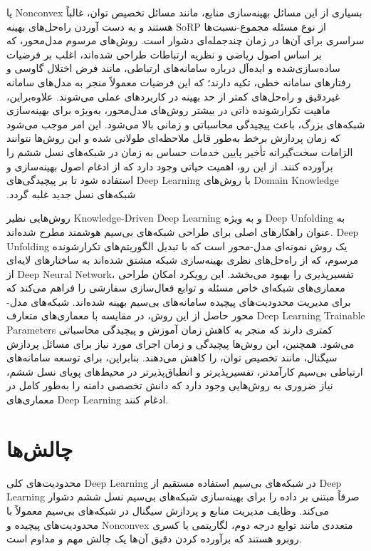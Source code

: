 ‫بسیاری از این مسائل بهینه‌سازی منابع، مانند مسائل تخصیص توان، غالباً
\gls{Nonconvex}
 یا از نوع مسئله مجموع-نسبت‌ها 
\gls{SoRP}
  هستند و به دست آوردن راه‌حل‌های بهینه سراسری برای آن‌ها در زمان چندجمله‌ای دشوار است. روش‌های مرسوم مدل‌محور، که بر اساس اصول ریاضی و نظریه ارتباطات طراحی شده‌اند، اغلب بر فرضیات ساده‌سازی‌شده و ایده‌آل درباره سامانه‌های ارتباطی، مانند فرض اختلال گاوسی و رفتارهای سامانه خطی، تکیه دارند؛ که این فرضیات معمولاً منجر به مدل‌های سامانه غیردقیق و راه‌حل‌های کمتر از حد بهینه در کاربردهای عملی می‌شوند. علاوه‌براین، ماهیت تکرارشونده ذاتی در بیشتر روش‌های مدل‌محور، به‌ویژه برای بهینه‌سازی شبکه‌های بزرگ، باعث پیچیدگی محاسباتی و زمانی بالا می‌شود. این امر موجب می‌شود که زمان پردازش برخط به‌طور قابل ملاحظه‌ای طولانی شده و این روش‌ها نتوانند الزامات سخت‌گیرانه تأخیر پایین خدمات حساس به زمان در شبکه‌های نسل ششم را برآورده کنند.‬
‫از این رو، اهمیت حیاتی وجود دارد که از ادغام اصول بهینه‌سازی و
\gls{Domain Knowledge}
 با روش‌های 
\gls{Deep Learning}
 استفاده شود تا بر پیچیدگی‌های شبکه‌های نسل جدید غلبه گردد.
 
  روش‌هایی نظیر 
\gls{Knowledge-Driven Deep Learning}
  و به ویژه 
\gls{Deep Unfolding}
   به عنوان راهکارهای اصلی برای طراحی شبکه‌های بی‌سیم هوشمند مطرح شده‌اند. 
\gls{Deep Unfolding}
   یک روش نمونه‌ای مدل-محور است که با تبدیل الگوریتم‌های تکرارشونده مرسوم، که از راه‌حل‌های نظری بهینه‌سازی شبکه مشتق شده‌اند به ساختارهای لایه‌ای از 
\gls{Deep Neural Network}،
 تفسیرپذیری را بهبود می‌بخشد. این رویکرد امکان طراحی معماری‌های شبکه‌ای خاص مسئله و توابع فعال‌سازی سفارشی را فراهم می‌کند که برای مدیریت محدودیت‌های پیچیده سامانه‌های بی‌سیم بهینه شده‌اند. شبکه‌های مدل-محور حاصل از این روش، در مقایسه با معماری‌های متعارف 
\gls{Deep Learning}   
\glspl{Trainable Parameter}
    کمتری دارند که منجر به کاهش زمان آموزش و پیچیدگی محاسباتی می‌شود. همچنین، این روش‌ها پیچیدگی و زمان اجرای مورد نیاز برای مسائل پردازش سیگنال، مانند تخصیص توان، را کاهش می‌دهند. بنابراین، برای توسعه سامانه‌های ارتباطی بی‌سیم کارآمدتر، تفسیرپذیرتر و انطباق‌پذیرتر در محیط‌های پویای نسل ششم، نیاز ضروری به روش‌هایی وجود دارد که دانش تخصصی دامنه را به‌طور کامل در معماری‌های 
\gls{Deep Learning}   
    ادغام کنند.‬

\section{چالش‌ها}

محدودیت‌های کلی 
\gls{Deep Learning}
 در شبکه‌های بی‌سیم استفاده مستقیم از 
\gls{Deep Learning}
 صرفاً مبتنی بر داده را برای بهینه‌سازی شبکه‌های بی‌سیم نسل ششم دشوار می‌کند. وظایف مدیریت منابع و پردازش سیگنال در شبکه‌های بی‌سیم معمولاً با محدودیت‌های پیچیده و
\gls{Nonconvex}
 متعددی مانند توابع درجه دوم، لگاریتمی یا کسری روبرو هستند که برآورده کردن دقیق آن‌ها یک چالش مهم و مداوم است.
 
